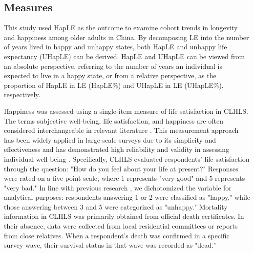 \documentclass[12pt, a4paper]{article}
\begin{document}
\subsection{Measures}
This study used HapLE as the outcome to examine cohort trends in longevity and happiness among older adults in China. By decomposing LE into the number of years lived in happy and unhappy states, both HapLE and unhappy life expectancy (UHapLE) can be derived. HapLE and UHapLE can be viewed from an absolute perspective, referring to the number of years an individual is expected to live in a happy state, or from a relative perspective, as the proportion of HapLE in LE (HapLE\%) and UHapLE in LE (UHapLE\%), respectively.

Happiness was assessed using a single-item measure of life satisfaction in CLHLS. The terms subjective well-being, life satisfaction, and happiness are often considered interchangeable in relevant literature \autocite{easterlin.2021.growth,yang.2008.long}. This measurement approach has been widely applied in large-scale surveys due to its simplicity and effectiveness and has demonstrated high reliability and validity in assessing individual well-being \autocite{baur.1983.stability,lucas.2018.shortterm}. Specifically, CLHLS evaluated respondents' life satisfaction through the question: "How do you feel about your life at present?" Responses were rated on a five-point scale, where 1 represents "very good" and 5 represents "very bad." In line with previous research \autocite{duan.2020.happy,wan.2024.socioeconomic}, we dichotomized the variable for analytical purposes: respondents answering 1 or 2 were classified as "happy," while those answering between 3 and 5 were categorized as "unhappy." Mortality information in CLHLS was primarily obtained from official death certificates. In their absence, data were collected from local residential committees or reports from close relatives. When a respondent's death was confirmed in a specific survey wave, their survival status in that wave was recorded as "dead."
\end{document}

